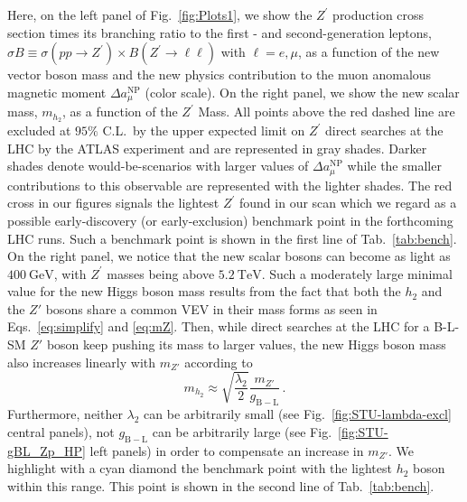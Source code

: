 \documentclass[10pt]{report}
\newcommand{\ro}[1]{\textrm{#1}}
\begin{document}
Here, on the left panel of Fig.~\ref{fig:Plots1}, we show the $Z^\prime$ production cross section times its branching ratio to the first - and second-generation leptons, $\sigma B \equiv \sigma \left( pp \to Z^\prime \right) \times B \left( Z^\prime \to \ell \ell \right) $ with $\ell = e,\mu$, as a function of the new vector boson mass and the new physics contribution to the muon anomalous magnetic moment $\Delta a^{\textrm{NP}}_\mu$ (color scale). 
%
On the right panel, we show the new scalar mass, $m_{h_2}$, as a function of the $Z^\prime$ Mass. 
%
All points above the red dashed line are excluded at $95\%$ C.L.~by the upper expected limit on $Z^\prime$ direct searches at the LHC by the ATLAS experiment and are represented in gray shades. 
%
Darker shades denote would-be-scenarios with larger values of $\Delta a^{\ro{NP}}_\mu$ while the smaller contributions to this observable are represented with the lighter shades. The red cross in our figures signals the lightest $Z^\prime$ found in our scan which we regard as a possible early-discovery (or early-exclusion) benchmark point in the forthcoming LHC runs. Such a benchmark point is shown in the first line of Tab.~\ref{tab:bench}. On the right panel, we notice that the new scalar bosons can become as light as $400~\ro{GeV}$, with $Z^\prime$ masses being above $5.2~\ro{TeV}$. Such a moderately large minimal value for the new Higgs boson mass results from the fact that both the $h_2$ and the $Z'$ bosons share a common VEV in their mass forms as seen in Eqs.~\eqref{eq:simplify} and \eqref{eq:mZ}. Then, while direct searches at the LHC for a B-L-SM $Z'$ boson keep pushing its mass to larger values, the new Higgs boson mass also increases linearly with $m_{Z'}$ according to
\begin{equation}
	m_{h_2} \approx \sqrt{\frac{\lambda_2}{2}} \frac{m_{Z'}}{g_{\mathrm{B-L}}}\,.
\end{equation} 
Furthermore, neither $\lambda_2$ can be arbitrarily small (see Fig.~\ref{fig:STU-lambda-excl} central panels), not $g_{\mathrm{B-L}}$ can be arbitrarily large (see Fig.~\ref{fig:STU-gBL_Zp_HP} left panels) in order to compensate an increase in $m_{Z'}$. We highlight with a cyan diamond the benchmark point with the lightest $h_2$ boson within this range. This point is shown in the second line of Tab.~\ref{tab:bench}.
\setlength{\tabcolsep}{2pt} %
\renewcommand{\arraystretch}{1} %
%
\end{document}
